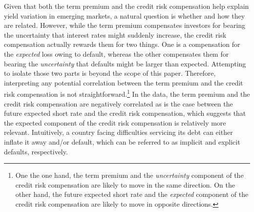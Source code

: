 {%
Given that both the term premium and the credit risk compensation help explain yield variation in emerging markets, a natural question is whether and how they are related.
However, while the term premium compensates investors for bearing the uncertainty that interest rates might suddenly increase, the credit risk compensation actually rewards them for two things. 
One is a compensation for the \textit{expected} loss owing to default, whereas the other compensates them for bearing the \textit{uncertainty} that defaults might be larger than expected. 
Attempting to isolate those two parts is beyond the scope of this paper.
Therefore, interpreting any potential correlation between the term premium and the credit risk compensation is not straightforward.\footnote{ One the one hand, the term premium and the \textit{uncertainty} component of the credit risk compensation are likely to move in the same direction. On the other hand, the future expected short rate and the \textit{expected} component of the credit risk compensation are likely to move in opposite directions.}
In the data, the term premium and the credit risk compensation are negatively correlated as is the case between the future expected short rate and the credit risk compensation, which suggests that 
the expected component of the credit risk compensation is relatively more relevant.
Intuitively, a country facing difficulties servicing its debt can either inflate it away and/or default, which can be referred to as implicit and explicit defaults, respectively. %
}
